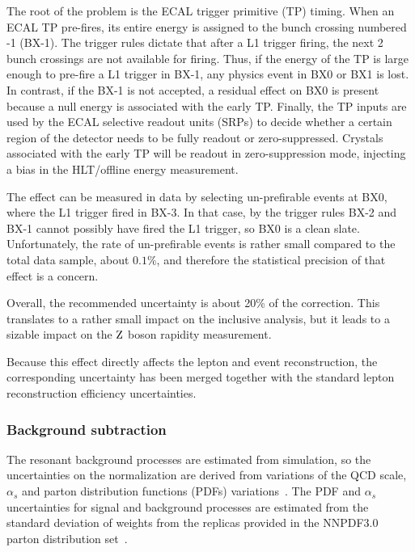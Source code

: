 The root of the problem is the ECAL trigger primitive (TP) timing.
When an ECAL TP pre-fires, its entire energy is assigned to the bunch crossing numbered -1 (BX-1).
The trigger rules dictate that after a L1 trigger firing, the next 2 bunch crossings are not available for firing.
Thus, if the energy of the TP is large enough to pre-fire a L1 trigger in BX-1,
any physics event in BX0 or BX1 is lost. 
In contrast, if the BX-1 is not accepted,
a residual effect on BX0 is present because a null energy is associated with the 
early TP. Finally, the TP inputs are used by the ECAL selective readout units 
(SRPs) to decide whether a certain region of the detector needs to be fully 
readout or zero-suppressed. Crystals associated with the early TP will be readout 
in zero-suppression mode, injecting a bias in the HLT/offline energy measurement.

The effect can be measured in data by selecting un-prefirable events at BX0, where the L1 trigger fired in BX-3.
In that case, by the trigger rules BX-2 and BX-1 cannot possibly have fired the L1 trigger, so BX0 is a clean slate.
Unfortunately, the rate of un-prefirable events 
is rather small compared to the total data sample, about $0.1\%$, and therefore 
the statistical precision of that effect is a concern. 

Overall, the recommended uncertainty is about 20\% of the correction. This translates 
to a rather small impact on the inclusive analysis, but it leads to a sizable impact 
on the $\mathrm{Z}$ boson rapidity measurement.

Because this effect directly affects the lepton and event reconstruction, the
corresponding uncertainty has been merged together with the standard lepton
reconstruction efficiency uncertainties.

\subsubsection{Background subtraction}

The resonant background processes are estimated from simulation, so
the uncertainties on 
the normalization are derived from variations of the QCD scale, $\alpha_{s}$ and 
parton distribution functions (PDFs) variations~\cite{Botje:2011sn,Alekhin:2011sk,Lai:2010vv,Martin:2009iq,Ball:2011mu,MCFM}. 
The PDF and $\alpha_s$ uncertainties for signal and background processes are estimated 
from the standard deviation of weights from the replicas provided in the 
NNPDF3.0 parton distribution set~\cite{nnpdf}.

